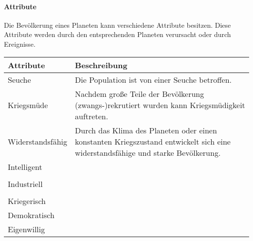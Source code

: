 \documentclass[11pt, a4paper]{article}
\begin{document}
\paragraph{Attribute}
Die Bevölkerung eines Planeten kann verschiedene Attribute besitzen. Diese Attribute werden durch den 
entsprechenden Planeten verursacht oder durch Ereignisse.
%
\begin{center}
    \begin{tabularx}{0.8\linewidth}{|l X|}
        \hline
        Attribute        & Beschreibung                                                                                                                    \\
        \hline
        Seuche           & Die Population ist von einer Seuche betroffen.                                                                                  \\
        Kriegsmüde       & Nachdem große Teile der Bevölkerung (zwangs-)rekrutiert wurden kann Kriegsmüdigkeit auftreten.                                  \\
        
        Widerstandsfähig & Durch das Klima des Planeten oder einen konstanten Kriegszustand entwickelt sich eine widerstandsfähige und starke Bevölkerung. \\
        
        Intelligent      &                                                                                                                                 \\                                                                                                                      \\
        Industriell      &                                                                                                                                 \\                                                                                                                    \\
        Kriegerisch      &                                                                                                                                 \\
        Demokratisch     &                                                                                                                                 \\
        Eigenwillig      &                                                                                                                                 \\
        
        \hline
    \end{tabularx}
\end{center}
%
\end{document}
